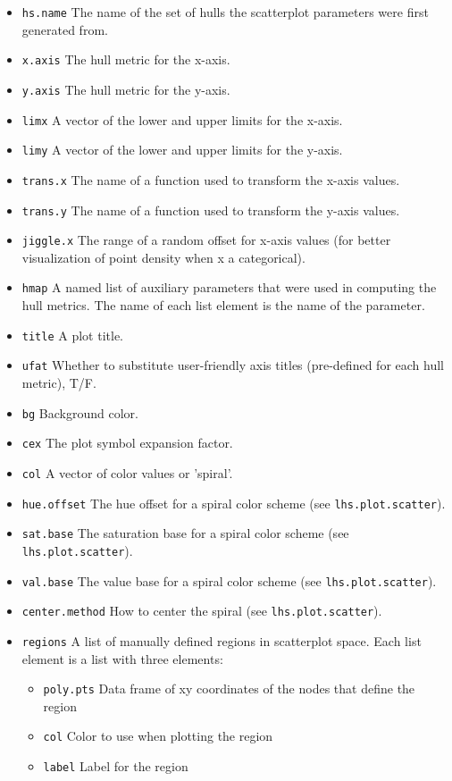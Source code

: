 \documentclass{article}
\begin{document}
\begin{itemize}
  \begin{itemize}
    \item \texttt{hs.name} The name of the set of hulls the scatterplot parameters were first generated from.
    \item \texttt{x.axis} The hull metric for the x-axis.
    \item \texttt{y.axis} The hull metric for the y-axis.
    \item \texttt{limx} A vector of the lower and upper limits for the x-axis.
    \item \texttt{limy} A vector of the lower and upper limits for the y-axis.
    \item \texttt{trans.x} The name of a function used to transform the x-axis values.
    \item \texttt{trans.y} The name of a function used to transform the y-axis values.
    \item \texttt{jiggle.x} The range of a random offset for x-axis values (for better visualization of point density when x a categorical).
    \item \texttt{hmap} A named list of auxiliary parameters that were used in computing the hull metrics. The name of each list element is the name of the parameter.
    \item \texttt{title} A plot title.
    \item \texttt{ufat} Whether to substitute user-friendly axis titles (pre-defined for each hull metric), T/F.
    \item \texttt{bg} Background color.
    \item \texttt{cex} The plot symbol expansion factor.
    \item \texttt{col} A vector of color values or 'spiral'.
    \item \texttt{hue.offset} The hue offset for a spiral color scheme (see \texttt{lhs.plot.scatter}).
    \item \texttt{sat.base} The saturation base for a spiral color scheme (see \texttt{lhs.plot.scatter}).
    \item \texttt{val.base} The value base for a spiral color scheme (see \texttt{lhs.plot.scatter}).
    \item \texttt{center.method} How to center the spiral (see \texttt{lhs.plot.scatter}).
    \item \texttt{regions} A list of manually defined regions in scatterplot space. Each list element is a list with three elements:
      \begin{itemize}
        \item \texttt{poly.pts} Data frame of xy coordinates of the nodes that define the region
        \item \texttt{col} Color to use when plotting the region
        \item \texttt{label} Label for the region
      \end{itemize}
  

\end{itemize}
\end{itemize}
\end{document}
